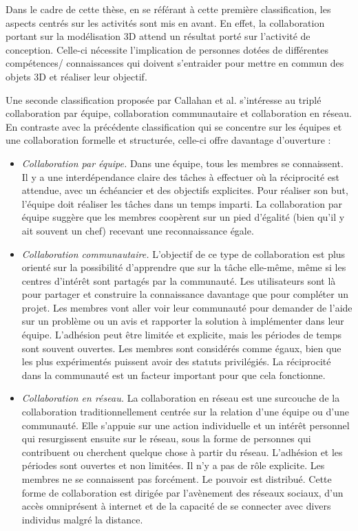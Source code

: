 Dans le cadre de cette thèse, en se référant à cette première classification, les 
aspects centrés sur les activités sont mis en avant. En effet, la collaboration 
portant sur la modélisation 3D attend un résultat porté sur l'activité de conception. 
Celle-ci nécessite l'implication de personnes dotées de différentes compétences/ connaissances qui doivent s'entraider pour mettre en commun des 
objets 3D et réaliser leur objectif. 

Une seconde classification proposée par Callahan et al. 
\cite{Callahan2008} s'intéresse au triplé \og{} collaboration par équipe\fg{}, \og{} 
collaboration 
communautaire\fg{} et \og{} collaboration en réseau\fg{}. En contraste avec la 
précédente 
classification qui se concentre sur les équipes et une collaboration formelle et 
structurée, celle-ci offre davantage d'ouverture :
\begin{itemize}
	\item \textit{Collaboration par équipe.}
	Dans une équipe, tous les membres se connaissent. Il y a une interdépendance 
	claire des tâches à effectuer où la réciprocité est attendue, avec un échéancier 
	et des objectifs explicites. Pour réaliser son but, l'équipe doit réaliser les tâches 
	dans un temps imparti. La collaboration par équipe suggère que les membres 
	coopèrent sur un pied d'égalité (bien qu'il y ait souvent un chef) recevant une 
	reconnaissance égale.
	
	\item \textit{Collaboration communautaire.}
	L'objectif de ce type de collaboration est plus orienté sur la possibilité 
	d'apprendre que sur la tâche elle-même, même si les centres d'intérêt sont 
	partagés par la communauté. Les utilisateurs sont là pour partager et construire 
	la connaissance davantage que pour compléter un projet. Les membres vont aller voir leur 
	communauté pour demander de l'aide sur un problème ou un avis et rapporter la 
	solution à implémenter dans leur équipe. L'adhésion peut être limitée et 
	explicite, mais les périodes de temps sont souvent ouvertes. Les membres 
	sont considérés comme égaux, bien que les plus expérimentés puissent avoir 
	des statuts privilégiés. La réciprocité dans la 
	communauté est un facteur important pour que cela fonctionne.
	
	\item \textit{Collaboration en réseau.}
	La collaboration en réseau est une surcouche de la collaboration 
	traditionnellement centrée sur la relation d'une équipe ou d'une communauté. 
	Elle s'appuie sur une action individuelle et un intérêt personnel qui resurgissent 
	ensuite sur le réseau, sous la forme de personnes qui contribuent ou cherchent 
	quelque chose à partir du réseau. L'adhésion et les périodes sont ouvertes et 
	non limitées. Il n'y a pas de rôle explicite. Les membres ne se connaissent pas 
	forcément. Le pouvoir est distribué. Cette forme de collaboration est dirigée par 
	l'avènement des réseaux sociaux, d'un accès omniprésent à internet et de la 
	capacité de se connecter avec divers individus malgré la distance.
\end{itemize}
